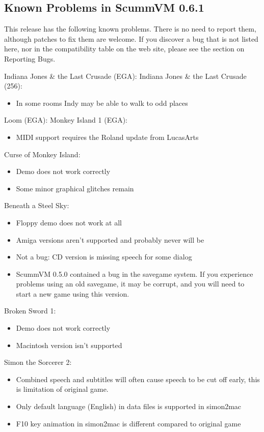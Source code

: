 

\subsection{Known Problems in ScummVM 0.6.1}

This release has the following known problems. There is no need to report them,
although patches to fix them are welcome. If you discover a bug that is not
listed here, nor in the compatibility table on the web site, please see
the section on Reporting Bugs.

Indiana Jones \& the Last Crusade (EGA):
Indiana Jones \& the Last Crusade (256):
  \begin{itemize}
  \item In some rooms Indy may be able to walk to odd places
  \end{itemize}
Loom (EGA):
Monkey Island 1 (EGA):
  \begin{itemize}
  \item MIDI support requires the Roland update from LucasArts
  \end{itemize}
Curse of Monkey Island:
  \begin{itemize}
  \item Demo does not work correctly
  \item Some minor graphical glitches remain
  \end{itemize}
Beneath a Steel Sky:
  \begin{itemize}
  \item Floppy demo does not work at all
  \item Amiga versions aren't supported and probably never will be
  \item Not a bug: CD version is missing speech for some dialog
  \item ScummVM 0.5.0 contained a bug in the savegame system.
                  If you experience problems using an old savegame, it may be
                  corrupt, and you will need to start a new game using this
                  version.
  \end{itemize}
Broken Sword 1:
  \begin{itemize}
  \item Demo does not work correctly
  \item Macintosh version isn't supported
  \end{itemize}
Simon the Sorcerer 2:
  \begin{itemize}
  \item Combined speech and subtitles will often cause speech to be
                  cut off early, this is limitation of original game.
  \item Only default language (English) in data files is supported
                  in simon2mac
  \item F10 key animation in simon2mac is different compared to
                  original game
  \end{itemize}
